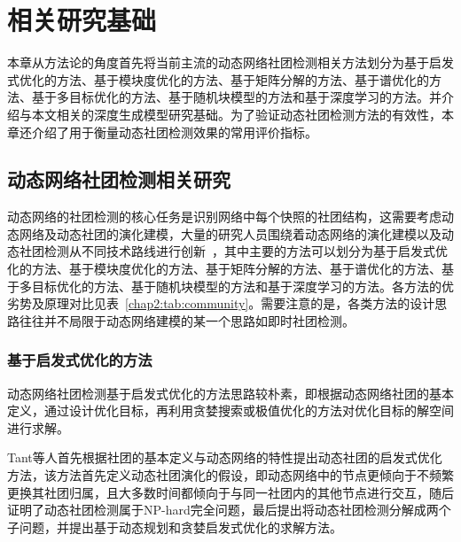 \baselineskip 20pt

\chapter{相关研究基础}
\label{chap:2}
本章从方法论的角度首先将当前主流的动态网络社团检测相关方法划分为基于启发式优化的方法、基于模块度优化的方法、基于矩阵分解的方法、基于谱优化的方法、基于多目标优化的方法、基于随机块模型的方法和基于深度学习的方法。并介绍与本文相关的深度生成模型研究基础。为了验证动态社团检测方法的有效性，本章还介绍了用于衡量动态社团检测效果的常用评价指标。

\section{动态网络社团检测相关研究}
动态网络的社团检测的核心任务是识别网络中每个快照的社团结构，这需要考虑动态网络及动态社团的演化建模，大量的研究人员围绕着动态网络的演化建模以及动态社团检测从不同技术路线进行创新~\cite{JSJX202302004}，其中主要的方法可以划分为基于启发式优化的方法、基于模块度优化的方法、基于矩阵分解的方法、基于谱优化的方法、基于多目标优化的方法、基于随机块模型的方法和基于深度学习的方法。各方法的优劣势及原理对比见表~\ref{chap2:tab:community}。需要注意的是，各类方法的设计思路往往并不局限于动态网络建模的某一个思路如即时社团检测。


\subsection{基于启发式优化的方法}
动态网络社团检测基于启发式优化的方法思路较朴素，即根据动态网络社团的基本定义，通过设计优化目标，再利用贪婪搜索或极值优化的方法对优化目标的解空间进行求解。

Tant等人\cite{tantipathananandh2007framework}首先根据社团的基本定义与动态网络的特性提出动态社团的启发式优化方法，该方法首先定义动态社团演化的假设，即动态网络中的节点更倾向于不频繁更换其社团归属，且大多数时间都倾向于与同一社团内的其他节点进行交互，随后证明了动态社团检测属于NP-hard完全问题，最后提出将动态社团检测分解成两个子问题，并提出基于动态规划和贪婪启发式优化的求解方法。

